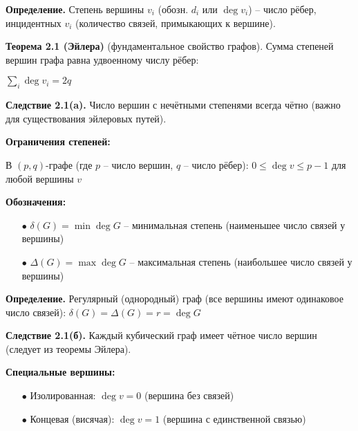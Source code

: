 \noindent\textbf{Определение.} Степень вершины $v_i$ (обозн. $d_i$ или $\deg v_i$) -- число рёбер, инцидентных $v_i$ (количество связей, примыкающих к вершине).

\noindent\textbf{Теорема 2.1 (Эйлера)} (фундаментальное свойство графов). Сумма степеней вершин графа равна удвоенному числу рёбер:

$\sum_i \deg v_i = 2q$

\noindent\textbf{Следствие 2.1(a).} Число вершин с нечётными степенями всегда чётно (важно для существования эйлеровых путей).

\noindent\textbf{Ограничения степеней:}

В $(p,q)$-графе (где $p$ -- число вершин, $q$ -- число рёбер): $0 \leq \deg v \leq p-1$ для любой вершины $v$

\noindent\textbf{Обозначения:}

\begin{itemize}

\item[$\bullet$] $\delta(G) = \min \deg G$ -- минимальная степень (наименьшее число связей у вершины)

\item[$\bullet$] $\Delta(G) = \max \deg G$ -- максимальная степень (наибольшее число связей у вершины)

\end{itemize}

\noindent\textbf{Определение.} Регулярный (однородный) граф (все вершины имеют одинаковое число связей): $\delta(G) = \Delta(G) = r = \deg G$

\noindent\textbf{Следствие 2.1(б).} Каждый кубический граф имеет чётное число вершин (следует из теоремы Эйлера).

\noindent\textbf{Специальные вершины:}

\begin{itemize}

\item[$\bullet$] Изолированная: $\deg v = 0$ (вершина без связей)

\item[$\bullet$] Концевая (висячая): $\deg v = 1$ (вершина с единственной связью)

\end{itemize}
